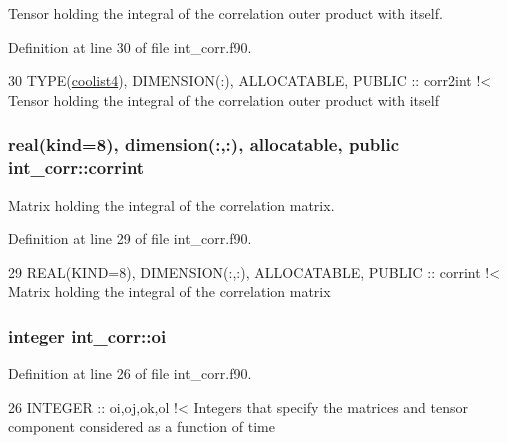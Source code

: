 Tensor holding the integral of the correlation outer product with itself. 



Definition at line 30 of file int\+\_\+corr.\+f90.


\begin{DoxyCode}
30   \textcolor{keywordtype}{TYPE}(\hyperlink{structtensor_1_1coolist4}{coolist4}), \textcolor{keywordtype}{DIMENSION(:)}, \textcolor{keywordtype}{ALLOCATABLE}, \textcolor{keywordtype}{PUBLIC} :: corr2int\textcolor{comment}{ !< Tensor holding the integral of
       the correlation outer product with itself}
\end{DoxyCode}
\subsubsection[{\texorpdfstring{corrint}{corrint}}]{\setlength{\rightskip}{0pt plus 5cm}real(kind=8), dimension(\+:,\+:), allocatable, public int\+\_\+corr\+::corrint}\hypertarget{namespaceint__corr_ab3c1d22e8c15412a3b535c8301b0c42d}{}\label{namespaceint__corr_ab3c1d22e8c15412a3b535c8301b0c42d}


Matrix holding the integral of the correlation matrix. 



Definition at line 29 of file int\+\_\+corr.\+f90.


\begin{DoxyCode}
29   \textcolor{keywordtype}{REAL(KIND=8)}, \textcolor{keywordtype}{DIMENSION(:,:)}, \textcolor{keywordtype}{ALLOCATABLE}, \textcolor{keywordtype}{PUBLIC} :: corrint\textcolor{comment}{ !< Matrix holding the integral of the
       correlation matrix}
\end{DoxyCode}
\subsubsection[{\texorpdfstring{oi}{oi}}]{\setlength{\rightskip}{0pt plus 5cm}integer int\+\_\+corr\+::oi\hspace{0.3cm}{\ttfamily [private]}}\hypertarget{namespaceint__corr_abddd3a2d3e1bfa4f09d96eaf090e9a95}{}\label{namespaceint__corr_abddd3a2d3e1bfa4f09d96eaf090e9a95}


Definition at line 26 of file int\+\_\+corr.\+f90.


\begin{DoxyCode}
26   \textcolor{keywordtype}{INTEGER} :: oi,oj,ok,ol\textcolor{comment}{ !< Integers that specify the matrices and tensor component considered as a
       function of time}
\end{DoxyCode}

